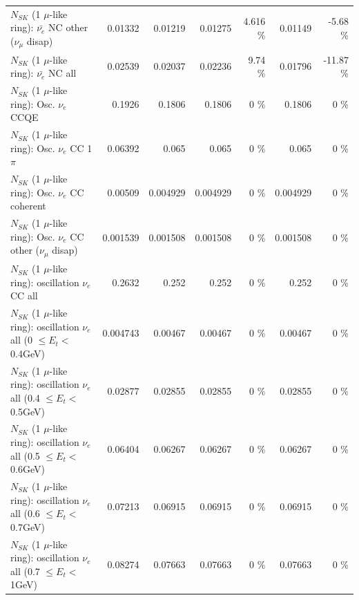 \begin{table}
\begin{tabular}{| l | r | r | r  r | r  r |}
          $N_{SK}$ (1 $\mu$-like ring): $\bar{\nu_e}$ NC other ($\nu_\mu$ disap) &         0.01332 &         0.01219 &         0.01275 &    4.616 \%  &         0.01149 &    -5.68 \%  \\ 
                            $N_{SK}$ (1 $\mu$-like ring): $\bar{\nu_{e}}$ NC all &         0.02539 &         0.02037 &         0.02236 &     9.74 \%  &         0.01796 &   -11.87 \%  \\ 
\hline
\hline
\hline
                                 $N_{SK}$ (1 $\mu$-like ring): Osc. $\nu_e$ CCQE &          0.1926 &          0.1806 &          0.1806 &        0 \%  &          0.1806 &        0 \%  \\ 
                            $N_{SK}$ (1 $\mu$-like ring): Osc. $\nu_e$ CC 1$\pi$ &         0.06392 &           0.065 &           0.065 &        0 \%  &           0.065 &        0 \%  \\ 
                          $N_{SK}$ (1 $\mu$-like ring): Osc. $\nu_e$ CC coherent &         0.00509 &        0.004929 &        0.004929 &        0 \%  &        0.004929 &        0 \%  \\ 
           $N_{SK}$ (1 $\mu$-like ring): Osc. $\nu_e$ CC other ($\nu_\mu$ disap) &        0.001539 &        0.001508 &        0.001508 &        0 \%  &        0.001508 &        0 \%  \\ 
                        $N_{SK}$ (1 $\mu$-like ring): oscillation $\nu_e$ CC all &          0.2632 &           0.252 &           0.252 &        0 \%  &           0.252 &        0 \%  \\ 
\hline
$N_{SK}$ (1 $\mu$-like ring): oscillation $\nu_{e}$ all (0 $\leq E_{t} <$ 0.4GeV) &        0.004743 &         0.00467 &         0.00467 &        0 \%  &         0.00467 &        0 \%  \\ 
$N_{SK}$ (1 $\mu$-like ring): oscillation $\nu_{e}$ all (0.4 $\leq E_{t} <$ 0.5GeV) &         0.02877 &         0.02855 &         0.02855 &        0 \%  &         0.02855 &        0 \%  \\ 
$N_{SK}$ (1 $\mu$-like ring): oscillation $\nu_{e}$ all (0.5 $\leq E_{t} <$ 0.6GeV) &         0.06404 &         0.06267 &         0.06267 &        0 \%  &         0.06267 &        0 \%  \\ 
$N_{SK}$ (1 $\mu$-like ring): oscillation $\nu_{e}$ all (0.6 $\leq E_{t} <$ 0.7GeV) &         0.07213 &         0.06915 &         0.06915 &        0 \%  &         0.06915 &        0 \%  \\ 
$N_{SK}$ (1 $\mu$-like ring): oscillation $\nu_{e}$ all (0.7 $\leq E_{t} <$ 1GeV) &         0.08274 &         0.07663 &         0.07663 &        0 \%  &         0.07663 &        0 \%  \\ 

\end{tabular}
\end{table}
